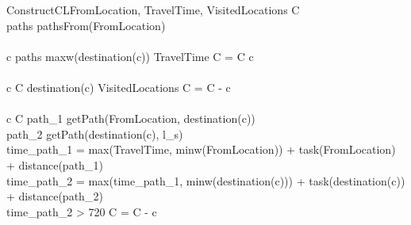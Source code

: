 \documentclass[]{report}
\begin{document}
\begin{pseudocode}{ConstructCL}{FromLocation, TravelTime, VisitedLocations}
\label{pc:construct_cl}
	C \GETS \varnothing\\
	paths \GETS pathsFrom(FromLocation)\\
	\\
	\FOREACH c \in paths \DO
		\IF maxw(destination(c)) \geq TravelTime \THEN
			C = C \cup c\\	
	\\
	\FOREACH c \in C \DO
		\IF destination(c) \in VisitedLocations \THEN
			C = C - c\\
	\\
	\FOREACH c \in C \DO
	\BEGIN
		path_{1} \GETS getPath(FromLocation, destination(c))\\
		path_{2} \GETS getPath(destination(c), l_{s})\\
		time_{path_{1}} = max(TravelTime, minw(FromLocation)) + task(FromLocation) + distance(path_{1})\\
		time_{path_{2}} = max(time_{path_{1}}, minw(destination(c))) + task(destination(c)) + distance(path_{2})\\
		\IF time_{path_{2}} > 720 \THEN
			C = C - c\\
	\END\\
	\\
\end{pseudocode}
\end{document}
